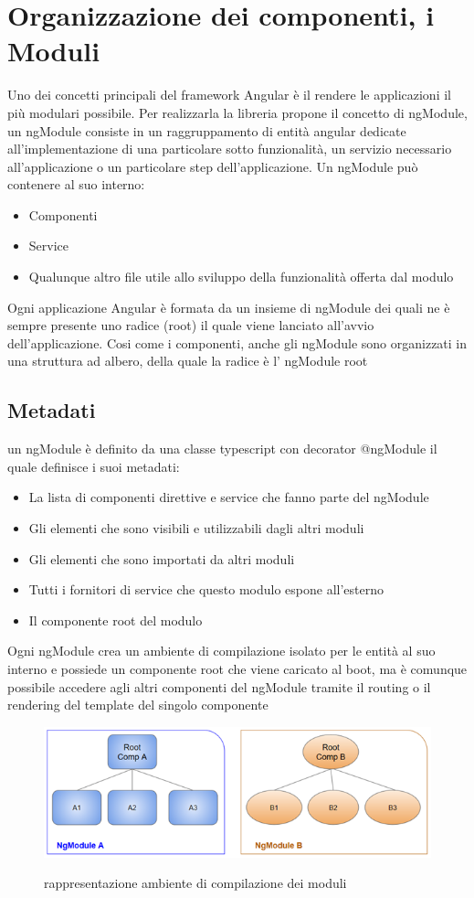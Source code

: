 \section{Organizzazione dei componenti, i Moduli}
Uno dei concetti principali del framework Angular è il rendere le applicazioni il più modulari possibile. Per realizzarla la libreria propone il concetto di ngModule, un ngModule consiste in un raggruppamento di entità angular dedicate all'implementazione di una particolare sotto funzionalità, un servizio necessario all'applicazione o un particolare step dell'applicazione.
Un ngModule può contenere al suo interno:
\begin{itemize}
    \item Componenti
    \item Service
    \item Qualunque altro file utile allo sviluppo della funzionalità offerta dal modulo
\end{itemize}
Ogni applicazione Angular è formata da un insieme di ngModule dei quali ne è sempre presente uno radice (root) il quale viene lanciato all'avvio dell'applicazione.
Cosi come i componenti, anche gli ngModule sono organizzati in una struttura ad albero,
della quale la radice è l' ngModule root 
\subsection{Metadati}
un ngModule è definito da una classe typescript con decorator @ngModule il quale definisce i suoi metadati:
\begin{itemize}
    \item La lista di componenti direttive e service che fanno parte del ngModule
    \item Gli elementi che sono visibili e utilizzabili dagli altri moduli
    \item Gli elementi che sono importati da altri moduli
    \item Tutti i fornitori di service che questo modulo espone all'esterno
    \item Il componente root del modulo
\end{itemize}
Ogni ngModule crea un ambiente di compilazione isolato per le entità al suo interno e possiede un componente root che viene caricato al boot, ma è comunque possibile accedere agli altri componenti del ngModule tramite il routing o il rendering del template del singolo componente
\begin{figure}[H]
    \centering
   \includegraphics[scale=1]{resources/compilation-context.png}
   \cite{angular-doc}
    \caption{rappresentazione ambiente di compilazione dei moduli}
\end{figure}


